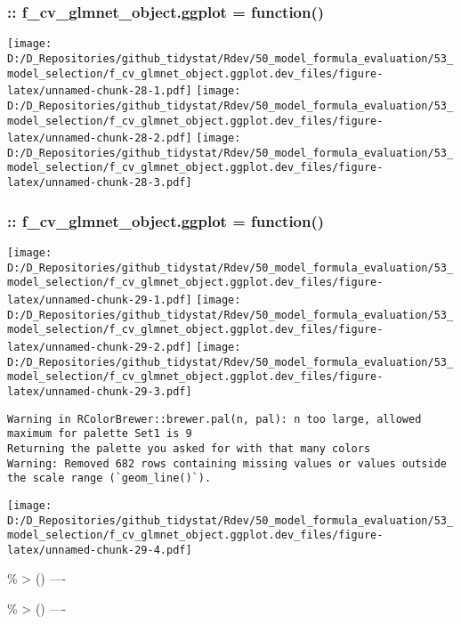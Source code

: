 \documentclass[
]{article}
\begin{document}
\hypertarget{f_cv_glmnet_object.ggplot-function-1}{%
\subsubsection{:: f\_cv\_glmnet\_object.ggplot =
function()}\label{f_cv_glmnet_object.ggplot-function-1}}

\texttt{[image: D:/D\_Repositories/github\_tidystat/Rdev/50\_model\_formula\_evaluation/53\_model\_selection/f\_cv\_glmnet\_object.ggplot.dev\_files/figure-latex/unnamed-chunk-28-1.pdf]}
\texttt{[image: D:/D\_Repositories/github\_tidystat/Rdev/50\_model\_formula\_evaluation/53\_model\_selection/f\_cv\_glmnet\_object.ggplot.dev\_files/figure-latex/unnamed-chunk-28-2.pdf]}
\texttt{[image: D:/D\_Repositories/github\_tidystat/Rdev/50\_model\_formula\_evaluation/53\_model\_selection/f\_cv\_glmnet\_object.ggplot.dev\_files/figure-latex/unnamed-chunk-28-3.pdf]}

\hypertarget{f_cv_glmnet_object.ggplot-function-2}{%
\subsubsection{:: f\_cv\_glmnet\_object.ggplot =
function()}\label{f_cv_glmnet_object.ggplot-function-2}}

\texttt{[image: D:/D\_Repositories/github\_tidystat/Rdev/50\_model\_formula\_evaluation/53\_model\_selection/f\_cv\_glmnet\_object.ggplot.dev\_files/figure-latex/unnamed-chunk-29-1.pdf]}
\texttt{[image: D:/D\_Repositories/github\_tidystat/Rdev/50\_model\_formula\_evaluation/53\_model\_selection/f\_cv\_glmnet\_object.ggplot.dev\_files/figure-latex/unnamed-chunk-29-2.pdf]}
\texttt{[image: D:/D\_Repositories/github\_tidystat/Rdev/50\_model\_formula\_evaluation/53\_model\_selection/f\_cv\_glmnet\_object.ggplot.dev\_files/figure-latex/unnamed-chunk-29-3.pdf]}

\begin{verbatim}
Warning in RColorBrewer::brewer.pal(n, pal): n too large, allowed maximum for palette Set1 is 9
Returning the palette you asked for with that many colors
Warning: Removed 682 rows containing missing values or values outside the scale range (`geom_line()`).
\end{verbatim}

\texttt{[image: D:/D\_Repositories/github\_tidystat/Rdev/50\_model\_formula\_evaluation/53\_model\_selection/f\_cv\_glmnet\_object.ggplot.dev\_files/figure-latex/unnamed-chunk-29-4.pdf]}

\% \textbar\textgreater{} () ----

\% \textbar\textgreater{} () ----
\end{document}
